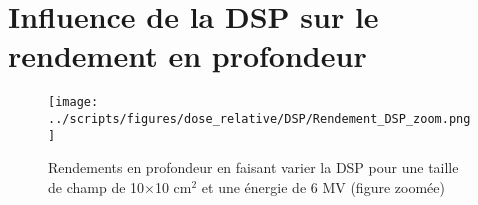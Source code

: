 \documentclass{book}
\begin{document}
\section{Influence de la DSP sur le rendement en profondeur}

\begin{figure}[h!]
  \centering
  \texttt{[image: ../scripts/figures/dose\_relative/DSP/Rendement\_DSP\_zoom.png]}
  \caption{Rendements en profondeur en faisant varier la DSP pour une taille de champ de 10$\times$10 cm$^2$ et une énergie de 6 MV (figure zoomée)}
  \label{fig_rdt_DSP_zoom}
\end{figure}

\clearpage


\nocite{*}
\end{document}
